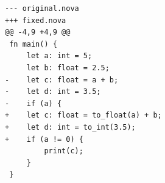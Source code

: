 \begin{lstlisting}[basicstyle=\ttfamily\scriptsize]
--- original.nova
+++ fixed.nova
@@ -4,9 +4,9 @@
 fn main() {
     let a: int = 5;
     let b: float = 2.5;
-    let c: float = a + b;
-    let d: int = 3.5;
-    if (a) {
+    let c: float = to_float(a) + b;
+    let d: int = to_int(3.5);
+    if (a != 0) {
         print(c);
     }
 }
\end{lstlisting}
